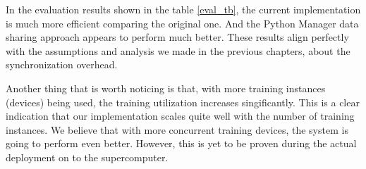 \documentclass[conference]{IEEEtran}
\begin{document}
\begin{table}[!htb]
\centering
\caption{\small Performance Evaluation}
\label{eval_tb}
\end{table}

In the evaluation results shown in the table \ref{eval_tb}, the current implementation is much more efficient comparing the original one. 
And the Python Manager data sharing approach appears to perform much better. 
These results align perfectly with the assumptions and analysis we made in the previous chapters, about the synchronization overhead. 

Another thing that is worth noticing is that, with more training instances (devices) being used, the training utilization increases singificantly. 
This is a clear indication that our implementation scales quite well with the number of training instances. 
We believe that with more concurrent training devices, the system is going to perform even better. 
However, this is yet to be proven during the actual deployment on to the supercomputer. 
\end{document}
